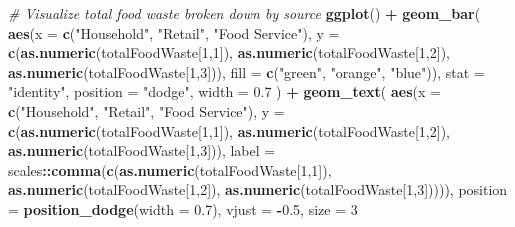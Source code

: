 \documentclass[
]{article}
\newenvironment{Shaded}{\begin{snugshade}}{\end{snugshade}}
\newcommand{\AttributeTok}[1]{\textcolor[rgb]{0.13,0.29,0.53}{#1}}
\newcommand{\CommentTok}[1]{\textcolor[rgb]{0.56,0.35,0.01}{\textit{#1}}}
\newcommand{\DecValTok}[1]{\textcolor[rgb]{0.00,0.00,0.81}{#1}}
\newcommand{\FloatTok}[1]{\textcolor[rgb]{0.00,0.00,0.81}{#1}}
\newcommand{\FunctionTok}[1]{\textcolor[rgb]{0.13,0.29,0.53}{\textbf{#1}}}
\newcommand{\NormalTok}[1]{#1}
\newcommand{\SpecialCharTok}[1]{\textcolor[rgb]{0.81,0.36,0.00}{\textbf{#1}}}
\newcommand{\StringTok}[1]{\textcolor[rgb]{0.31,0.60,0.02}{#1}}
\begin{document}
\begin{Shaded}
\begin{Highlighting}[]
\CommentTok{\# Visualize total food waste broken down by source}
\FunctionTok{ggplot}\NormalTok{() }\SpecialCharTok{+}
  \FunctionTok{geom\_bar}\NormalTok{(}
    \FunctionTok{aes}\NormalTok{(}\AttributeTok{x =} \FunctionTok{c}\NormalTok{(}\StringTok{"Household"}\NormalTok{, }\StringTok{"Retail"}\NormalTok{, }\StringTok{"Food Service"}\NormalTok{), }
        \AttributeTok{y =} \FunctionTok{c}\NormalTok{(}\FunctionTok{as.numeric}\NormalTok{(totalFoodWaste[}\DecValTok{1}\NormalTok{,}\DecValTok{1}\NormalTok{]), }
              \FunctionTok{as.numeric}\NormalTok{(totalFoodWaste[}\DecValTok{1}\NormalTok{,}\DecValTok{2}\NormalTok{]), }
              \FunctionTok{as.numeric}\NormalTok{(totalFoodWaste[}\DecValTok{1}\NormalTok{,}\DecValTok{3}\NormalTok{])), }
        \AttributeTok{fill =} \FunctionTok{c}\NormalTok{(}\StringTok{"green"}\NormalTok{, }\StringTok{"orange"}\NormalTok{, }\StringTok{"blue"}\NormalTok{)),}
    \AttributeTok{stat =} \StringTok{"identity"}\NormalTok{, }
    \AttributeTok{position =} \StringTok{"dodge"}\NormalTok{, }
    \AttributeTok{width =} \FloatTok{0.7}
\NormalTok{  ) }\SpecialCharTok{+}
  \FunctionTok{geom\_text}\NormalTok{(}
    \FunctionTok{aes}\NormalTok{(}\AttributeTok{x =} \FunctionTok{c}\NormalTok{(}\StringTok{"Household"}\NormalTok{, }\StringTok{"Retail"}\NormalTok{, }\StringTok{"Food Service"}\NormalTok{), }
        \AttributeTok{y =} \FunctionTok{c}\NormalTok{(}\FunctionTok{as.numeric}\NormalTok{(totalFoodWaste[}\DecValTok{1}\NormalTok{,}\DecValTok{1}\NormalTok{]), }
              \FunctionTok{as.numeric}\NormalTok{(totalFoodWaste[}\DecValTok{1}\NormalTok{,}\DecValTok{2}\NormalTok{]), }
              \FunctionTok{as.numeric}\NormalTok{(totalFoodWaste[}\DecValTok{1}\NormalTok{,}\DecValTok{3}\NormalTok{])), }
        \AttributeTok{label =}\NormalTok{ scales}\SpecialCharTok{::}\FunctionTok{comma}\NormalTok{(}\FunctionTok{c}\NormalTok{(}\FunctionTok{as.numeric}\NormalTok{(totalFoodWaste[}\DecValTok{1}\NormalTok{,}\DecValTok{1}\NormalTok{]), }
                                \FunctionTok{as.numeric}\NormalTok{(totalFoodWaste[}\DecValTok{1}\NormalTok{,}\DecValTok{2}\NormalTok{]), }
                                \FunctionTok{as.numeric}\NormalTok{(totalFoodWaste[}\DecValTok{1}\NormalTok{,}\DecValTok{3}\NormalTok{])))),}
    \AttributeTok{position =} \FunctionTok{position\_dodge}\NormalTok{(}\AttributeTok{width =} \FloatTok{0.7}\NormalTok{),}
    \AttributeTok{vjust =} \SpecialCharTok{{-}}\FloatTok{0.5}\NormalTok{, }\AttributeTok{size =} \DecValTok{3}

\end{Highlighting}
\end{Shaded}
\end{document}
